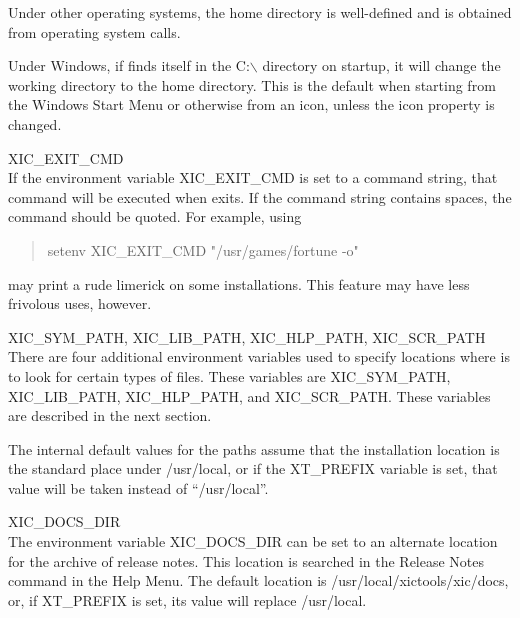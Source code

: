 \begin{description}
Under other operating systems, the home directory is well-defined
and is obtained from operating system calls.

Under Windows, if {\Xic} finds itself in the {\vt C:$\backslash$}
directory on startup, it will change the working directory to the home
directory.  This is the default when starting from the Windows {\cb
Start Menu} or otherwise from an icon, unless the icon property is
changed.

\item{\et XIC\_EXIT\_CMD}\\
If the environment variable {\et XIC\_EXIT\_CMD} is set to a command string,
that command will be executed when {\Xic} exits.  If the command string
contains spaces, the command should be quoted.  For example, using
\begin{quote}
{\vt setenv XIC\_EXIT\_CMD "/usr/games/fortune -o"}
\end{quote}
may print a rude limerick on some installations.  This feature may
have less frivolous uses, however.

\item{{\et XIC\_SYM\_PATH}, {\et XIC\_LIB\_PATH}, {\et XIC\_HLP\_PATH},
  {\et XIC\_SCR\_PATH}}\\
There are four additional environment variables used to specify
locations where {\Xic} is to look for certain types of files.  These
variables are {\et XIC\_SYM\_PATH}, {\et XIC\_LIB\_PATH}, {\et
XIC\_HLP\_PATH}, and {\et XIC\_SCR\_PATH}.  These variables are
described in the next section.

The internal default values for the paths assume that the installation
location is the standard place under {\vt /usr/local}, or if the {\et
XT\_PREFIX} variable is set, that value will be taken instead of
``{\vt /usr/local}''.

\item{\et XIC\_DOCS\_DIR}\\
The environment variable {\et XIC\_DOCS\_DIR} can be set to an
alternate location for the archive of release notes.  This location is
searched in the {\cb Release Notes} command in the {\cb Help Menu}. 
The default location is {\vt /usr/local/xictools/xic/docs}, or,
if {\et XT\_PREFIX} is set, its value will replace {\vt /usr/local}.


\end{description}
